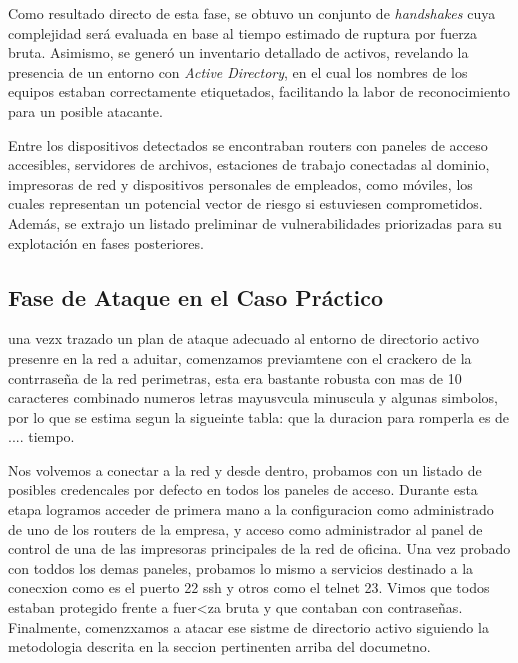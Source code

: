 \documentclass[a4paper, 11pt]{article}
\begin{document}
Como resultado directo de esta fase, se obtuvo un conjunto de \textit{handshakes} cuya complejidad será evaluada en base al tiempo estimado de ruptura por fuerza bruta. Asimismo, se generó un inventario detallado de activos, revelando la presencia de un entorno con \textit{Active Directory}, en el cual los nombres de los equipos estaban correctamente etiquetados, facilitando la labor de reconocimiento para un posible atacante.

\par\vspace{0.5cm}

Entre los dispositivos detectados se encontraban routers con paneles de acceso accesibles, servidores de archivos, estaciones de trabajo conectadas al dominio, impresoras de red y dispositivos personales de empleados, como móviles, los cuales representan un potencial vector de riesgo si estuviesen comprometidos. Además, se extrajo un listado preliminar de vulnerabilidades priorizadas para su explotación en fases posteriores.

\par\vspace{0.5cm}


\label{sec:fingerprint}
\label{sec:analisis_vulnerabilidades}
\label{sec:osint}
\label{anexo:script_evasion}
\label{codigo:wireshark}

\par\vspace{0.5cm}

\subsection{Fase de Ataque en el Caso Práctico}


una vezx trazado un plan de ataque adecuado al entorno de directorio activo presenre en la red a aduitar, comenzamos previamtene con el crackero de la contrraseña de la red perimetras, esta era bastante robusta con mas de 10 caracteres combinado numeros letras mayusvcula minuscula y algunas simbolos, por lo que se estima segun la sigueinte tabla: que la duracion para romperla es de .... tiempo.

Nos volvemos a conectar a la red y desde dentro, probamos con un listado de posibles credencales por defecto en todos los paneles de acceso. Durante esta etapa logramos acceder de primera mano a la configuracion como administrado de uno de los routers de la empresa, y acceso como administrador al panel de control de una de las impresoras principales de la red de oficina. Una vez probado con toddos los demas paneles, probamos lo mismo a servicios destinado a la conecxion como es el puerto 22 ssh y otros como el telnet 23. Vimos que todos estaban protegido frente a fuer<za bruta y que contaban con contraseñas. Finalmente, comenzxamos a atacar ese sistme de directorio activo siguiendo la metodologia descrita en la seccion pertinenten arriba del documetno.
\end{document}
